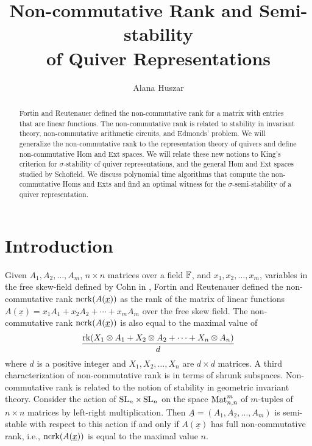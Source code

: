 \documentclass[12pt]{amsart}
\title{Non-commutative Rank and Semi-stability\\ of Quiver Representations}
\author{Alana Huszar}
\begin{document}
\begin{abstract}
Fortin and Reutenauer defined the non-commutative rank for a matrix with entries that are linear functions. The  non-commutative rank is related to stability in invariant theory,
non-commutative arithmetic circuits, and Edmonds' problem. We will generalize the  non-commutative rank to the representation theory of quivers and define 
non-commutative Hom and Ext spaces. We will relate these new notions  to King's criterion for $\sigma$-stability
of quiver representations, and the general Hom and Ext spaces studied by Schofield. We discuss polynomial time algorithms that compute
the non-commutative Homs and Exts and find an optimal witness for the $\sigma$-semi-stability
of a quiver representation.

\end{abstract}

\maketitle

\section{Introduction}
Given $A_1,A_2,\dots,A_m$, $n\times n$ matrices over a field ${\mathbb F}$, and $x_1,x_2,\dots,x_m$, variables in the free skew-field defined by Cohn in \cite{Cohn95}, Fortin and Reutenauer \cite{FR04} defined the non-commutative rank $\operatorname{ncrk}(A(\underline{x}))$ as the rank of 
the matrix of linear functions $A(\underline{x})=x_1A_1+x_2A_2+\cdots+x_mA_m$ over the free skew field. The non-commutative rank $\operatorname{ncrk}(A(\underline{x}))$ is also equal to the maximal value of 
$$\frac{\operatorname{rk}(X_1\otimes A_1+X_2\otimes A_2+\cdots+X_n\otimes A_n)}{d}
$$
where $d$ is a positive integer and $X_1,X_2,\dots,X_n$ are $d\times d$ matrices. A third characterization of non-commutative rank is in terms of shrunk subspaces.
Non-commutative rank is related to the notion of stability in geometric invariant theory. Consider the action of $\operatorname{SL}_n\times \operatorname{SL}_n$ on the space $\operatorname{Mat}_{n,n}^m$ of $m$-tuples of $n\times n$ matrices by left-right multiplication.
Then $\underline{A}=(A_1,A_2,\dots,A_m)$ is semi-stable with respect to this action if and only if $A(\underline{x})$ has full non-commutative rank, i.e., $\operatorname{ncrk}(A(\underline{x}))$ is equal to the maximal value $n$.
\end{document}
